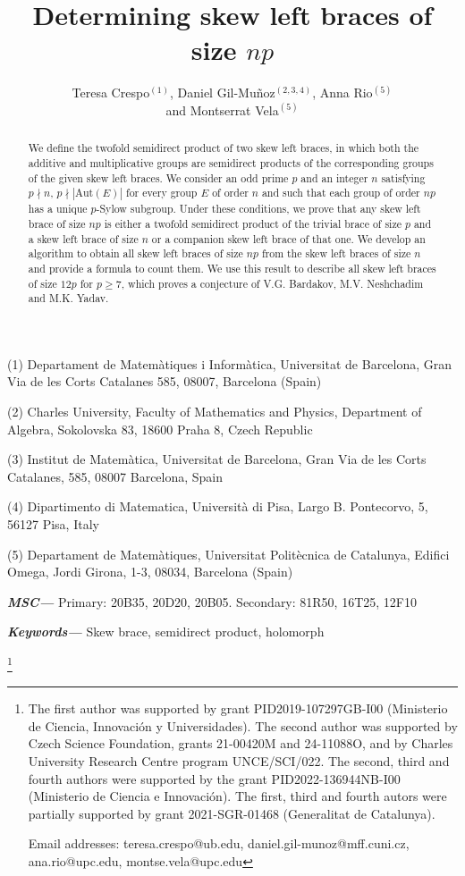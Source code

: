 \documentclass[12pt]{article}
\title{Determining skew left braces of size $np$}
\author{Teresa Crespo$^{(1)}$, Daniel Gil-Mu\~noz$^{(2,3,4)}$, Anna Rio$^{(5)}$ \\ and Montserrat Vela$^{(5)}$}
\date{}
\theoremstyle{definition}
\newcommand\blfootnote[1]{%
	\begingroup
	\renewcommand\thefootnote{}\footnote{#1}%
	\addtocounter{footnote}{-1}%
	\endgroup
}
\providecommand{\keywords}[1]{\textbf{\textit{Keywords---}} #1}
\providecommand{\MSC}[1]{\textbf{\textit{MSC---}} #1}
\begin{document}
	
	\maketitle	
	
	\footnotesize
	
	\noindent
	(1) Departament de Matem\`atiques i Inform\`atica, Universitat de Barcelona, Gran Via de les Corts Catalanes 585, 08007, Barcelona (Spain)
	
	\noindent
	(2) Charles University, Faculty of Mathematics and Physics, Department of Algebra, Sokolovska 83, 18600 Praha 8, Czech Republic
	
	\noindent
	(3) Institut de Matemàtica, Universitat de Barcelona, Gran Via de les Corts Catalanes, 585, 08007 Barcelona, Spain

    \noindent
    (4) Dipartimento di Matematica, Università di Pisa, Largo B. Pontecorvo, 5, 56127 Pisa, Italy
    
	\noindent
	(5) Departament de Matem\`atiques, Universitat Polit\`ecnica de Catalunya, Edifici Omega, Jordi Girona, 1-3, 08034, Barcelona (Spain)
	
	\begin{abstract}
		We define the twofold semidirect product of two skew left braces, in which both the additive and multiplicative groups are semidirect products of the corresponding groups of the given skew left braces. We consider an odd prime $p$ and an integer $n$ satisfying $p\nmid n$, $p\nmid|\mathrm{Aut}(E)|$ for every group $E$ of order $n$ and such that each group of order $np$ has a unique $p$-Sylow subgroup. Under these conditions, we prove that any skew left brace of size $np$ is either a twofold semidirect product of the trivial brace of size $p$ and a skew left brace of size $n$ or a companion skew left brace of that one. We develop an algorithm to obtain all skew left braces of size $np$ from the skew left braces of size $n$ and provide a formula to count them. We use this result to describe all skew left braces of size $12p$ for $p\geq 7$, which proves a conjecture of V.G. Bardakov, M.V. Neshchadim and M.K. Yadav.
	\end{abstract}
	
	\MSC{Primary: 20B35, 20D20, 20B05. Secondary: 81R50, 16T25, 12F10}
	
	\keywords{Skew brace, semidirect product, holomorph}
	
	\blfootnote{The first author was supported
		by grant PID2019-107297GB-I00 (Ministerio de Ciencia, Innovación y Universidades).
		The second author was supported by Czech Science Foundation, grants 21-00420M and 24-11088O, and by Charles University Research Centre program UNCE/SCI/022. The second, third and fourth authors were supported by the grant PID2022-136944NB-I00 (Ministerio de Ciencia e Innovación). The first, third and fourth autors were partially supported by grant 2021-SGR-01468 (Generalitat de Catalunya).
		
		Email addresses: teresa.crespo@ub.edu, daniel.gil-munoz@mff.cuni.cz, ana.rio@upc.edu, montse.vela@upc.edu }
	
\end{document}
